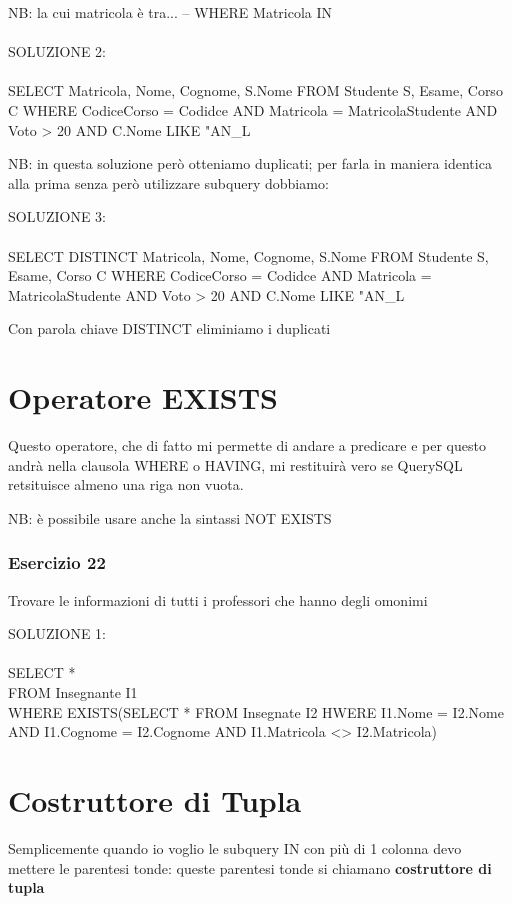 \documentclass{article}
\begin{document}
NB: la cui matricola è tra... -- WHERE Matricola IN\\
\\
SOLUZIONE 2:\\
\\
SELECT Matricola, Nome, Cognome, S.Nome
FROM Studente S, Esame, Corso C
WHERE CodiceCorso = Codidce AND Matricola = MatricolaStudente AND Voto > 20 AND C.Nome LIKE "AN_L%

NB: in questa soluzione però otteniamo duplicati; per farla in maniera identica alla prima senza però utilizzare subquery dobbiamo:

SOLUZIONE 3:\\
\\
SELECT DISTINCT Matricola, Nome, Cognome, S.Nome
FROM Studente S, Esame, Corso C
WHERE CodiceCorso = Codidce AND Matricola = MatricolaStudente AND Voto > 20 AND C.Nome LIKE "AN_L%

Con parola chiave DISTINCT eliminiamo i duplicati 

\section{Operatore EXISTS}
Questo operatore, che di fatto mi permette di andare a predicare e per questo andrà nella clausola WHERE o HAVING, mi restituirà vero se QuerySQL retsituisce almeno una riga non vuota.

NB: è possibile usare anche la sintassi NOT EXISTS

\subsubsection{Esercizio 22}
Trovare le informazioni di tutti i professori che hanno degli omonimi

SOLUZIONE 1:\\
\\
SELECT *\\
FROM Insegnante I1\\
WHERE EXISTS(SELECT * FROM Insegnate I2 HWERE I1.Nome = I2.Nome AND I1.Cognome = I2.Cognome AND I1.Matricola <> I2.Matricola)

\section{Costruttore di Tupla}
Semplicemente quando io voglio le subquery IN con più di 1 colonna devo mettere le parentesi tonde: queste parentesi tonde si chiamano \textbf{costruttore di tupla}
\end{document}
